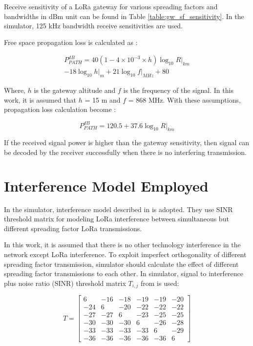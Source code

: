 Receive sensitivity of a LoRa gateway for various spreading factors and bandwidths in dBm unit can be found in Table \ref{table:gw_sf_sensitivity}. In the simulator, 125 kHz bandwidth receive sensitivities are used.

Free space propagation loss is calculated as \cite{TR136.942}:

\begin{equation} \label{eq:propagation_loss}
\begin{split}
P^{dB}_{PATH} = 40(1 - 4 \times 10^{-3} \times h){\log_{10} R|_{km}} \\
- 18 {\log_{10} h|_{m}} + 21 {\log_{10} f|_{MHz}} + 80
\end{split}
\end{equation}

Where, $h$ is the gateway altitude and $f$ is the frequency of the signal. In this work, it is assumed that $h$ = 15 m and $f$ = 868 MHz. With these assumptions, propagation loss calculation become \cite{7996384}:

\begin{equation} \label{eq:propagation_loss_simplified}
P^{dB}_{PATH} = 120.5 + 37.6 {\log_{10} R|_{km}}
\end{equation}

If the received signal power is higher than the gateway sensitivity, then signal can be decoded by the receiver successfully when there is no interfering transmission.

\section{Interference Model Employed}

In the simulator, interference model described in \cite{7996384} is adopted. They use SINR threshold matrix for modeling LoRa interference between simultaneous but different spreading factor LoRa transmissions.

In this work, it is assumed that there is no other technology interference in the network except LoRa interference. To exploit imperfect orthogonality of different spreading factor transmission, simulator should calculate the effect of different spreading factor transmissions to each other. In simulator, signal to interference plus noise ratio (SINR) threshold matrix $T_{i,j}$ from \cite{goursaud:hal-01231221} is used:

\begin{equation} \label{eq:sinr}	
T = \begin{bmatrix}	
       6 & -16 & -18 & -19 & -19 & -20 \\	
     -24 &   6 & -20 & -22 & -22 & -22 \\	
     -27 & -27 &   6 & -23 & -25 & -25 \\	
     -30 & -30 & -30 &   6 & -26 & -28 \\	
     -33 & -33 & -33 & -33 &   6 & -29 \\	
     -36 & -36 & -36 & -36 & -36 &   6	
     \end{bmatrix}	
\end{equation}

